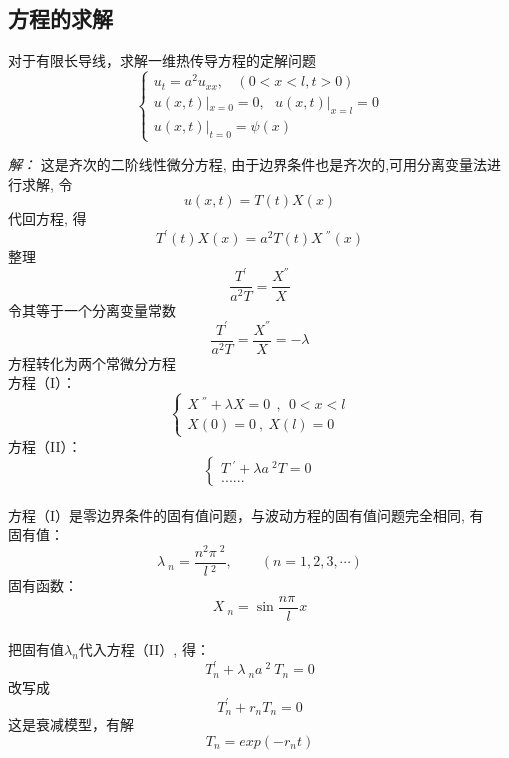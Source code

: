 \subsection{方程的求解}
\begin{example}
	对于有限长导线，求解一维热传导方程的定解问题 \\
	$$\displaystyle \begin{cases}
		u_{t}=a^2u_{xx} ,~~~~ (0<x<l, t>0)\\
		 u(x,t)|_{x=0}= 0, ~~~  u(x,t)|_{x=l}= 0  \\
		u(x,t)|_{t=0}= \psi (x)
	\end{cases}$$ 
\end{example}
\emph{解：}
	这是齐次的二阶线性微分方程, 由于边界条件也是齐次的,可用分离变量法进行求解,
	令 $$\displaystyle  u(x,t)=T(t)X(x) $$ 代回方程, 得 
	\begin{equation*}
		T^{'}(t)X(x) =a^2 T(t)X~^{''}(x) 
	\end{equation*}
	整理
	\begin{equation*}
		\frac{T^{'}}{a^2 T}=\frac{X^{''} }{X} 
	\end{equation*}
	令其等于一个分离变量常数
	\begin{equation*}
		\frac{T^{'}}{a^2 T}=\frac{X^{''} }{X} =-\lambda 
	\end{equation*}
	方程转化为两个常微分方程 \\
	方程（I）：\\
	$$\displaystyle  \begin{cases}
		X~^{''} +\lambda X=0  ~~,~~ 0<x<l\\
		X(0)=0 ~,~X(l)=0
	\end{cases}$$ 	
	方程（II）：\\
	$$\displaystyle  \begin{cases}
		T~^{'} +\lambda {a~^2 T}=0 \\
		......
	\end{cases}$$ 
	~~\\ 
	方程（I）是零边界条件的固有值问题，与波动方程的固有值问题完全相同, 有\\
	固有值：$$\displaystyle  \lambda~_n=\frac{n^2\pi~^2}{l~^2}, \qquad (n=1,2,3,\cdots)$$  
	固有函数：$$\displaystyle  X~_n= \sin \frac{n\pi~}{l} x$$
	~~\\ 	
	把固有值$\lambda_n$代入方程（II）, 得：
	$$\displaystyle  T_n^{'} +\lambda~_n a~^2 ~T_n=0 $$ 
	改写成 $$\displaystyle  T_n^{'} + r_n T_n=0 $$  
	这是衰减模型，有解
	\begin{equation*}
		T_n= exp(-r_nt)
	\end{equation*}
